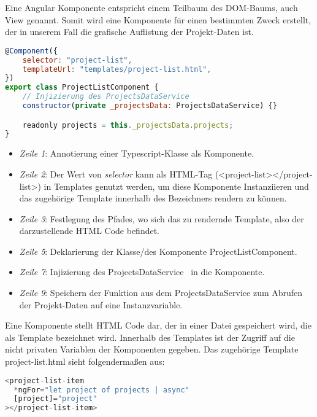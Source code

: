 Eine Angular Komponente entspricht einem Teilbaum des DOM-Baums, auch View genannt.
Somit wird eine Komponente für einen bestimmten Zweck erstellt,
der in unserem Fall die grafische Auflistung der Projekt-Daten ist.

\begin{lstlisting}[language=JavaScript,float=h!,caption={Funktion zum Abruf aller Projekte vom Server}, label={lst:example:component}]
@Component({
    selector: "project-list",
    templateUrl: "templates/project-list.html",
})
export class ProjectListComponent {
    // Injizierung des ProjectsDataService
    constructor(private _projectsData: ProjectsDataService) {}

    readonly projects = this._projectsData.projects;
}
\end{lstlisting}

\begin{itemize}
    \setlength\itemsep{-1em}
    \item \emph{Zeile 1}: Annotierung einer Typescript-Klasse als Komponente.
    \item \emph{Zeile 2}: Der Wert von \emph{selector} kann als HTML-Tag (<project-list></project-list>) in Templates genutzt werden,
    um diese Komponente Instanziieren und das zugehörige Template innerhalb des Bezeichners rendern zu können.
    \item \emph{Zeile 3}: Festlegung des Pfades, wo sich das zu rendernde Template, also der darzustellende HTML Code befindet.
    \item \emph{Zeile 5}: Deklarierung der Klasse/des Komponente ProjectListComponent.
    \item \emph{Zeile 7}: Injizierung des ProjectsDataService~\cite{angular-http} in die Komponente.
    \item \emph{Zeile 9}: Speichern der Funktion aus dem ProjectsDataService zum Abrufen der Projekt-Daten auf eine Instanzvariable.
\end{itemize}

Eine Komponente stellt HTML Code dar, der in einer Datei gespeichert wird, die als Template bezeichnet wird.
Innerhalb des Templates ist der Zugriff auf die nicht privaten Variablen der Komponenten gegeben.
Das zugehörige Template project-list.html sieht folgendermaßen aus:

\begin{lstlisting}[language=JavaScript,float=h!,caption={Funktion zum Abruf aller Projekte vom Server}, label={lst:example:service}]
<project-list-item
  *ngFor="let project of projects | async"
  [project]="project"
></project-list-item>
\end{lstlisting}

